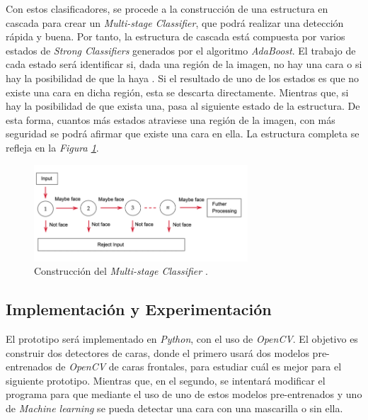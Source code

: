 Con estos clasificadores, se procede a la construcción de una estructura en cascada para crear un \textit{Multi-stage Classifier}, que podrá realizar una detección rápida y buena. Por tanto, la estructura de cascada está compuesta por varios estados de \textit{Strong Classifiers} generados por el algoritmo \textit{AdaBoost}. El trabajo de cada estado será identificar si, dada una región de la imagen, no hay una cara o si hay la posibilidad de que la haya \cite{adaboost1}. Si el resultado de uno de los estados es que no existe una cara en dicha región, esta se descarta directamente. Mientras que, si hay la posibilidad de que exista una, pasa al siguiente estado de la estructura. De esta forma, cuantos más estados atraviese una región de la imagen, con más seguridad se podrá afirmar que existe una cara en ella. La estructura completa se refleja en la \textit{Figura \ref{fig:ada2}}.

\begin{figure}[htp]
	\centering
	\includegraphics[width=8cm]{imagenes/ada2.png}
	\caption[Construcción del \textit{Multi-stage Classifier}]{Construcción del \textit{Multi-stage Classifier} \cite{adaboost2}.}
	\label{fig:ada2}
\end{figure}

\vspace{-0.7cm}
\subsection*{Implementación y Experimentación}
\vspace{-0.5cm}
El prototipo será implementado en \textit{Python}, con el uso de \textit{OpenCV}. El objetivo es construir dos detectores de caras, donde el primero usará dos modelos pre-entrenados de \textit{OpenCV} de caras frontales, para estudiar cuál es mejor para el siguiente prototipo. Mientras que, en el segundo, se intentará modificar el programa para que mediante el uso de uno de estos modelos pre-entrenados y uno de \textit{Machine learning} se pueda detectar una cara con una mascarilla o sin ella.

